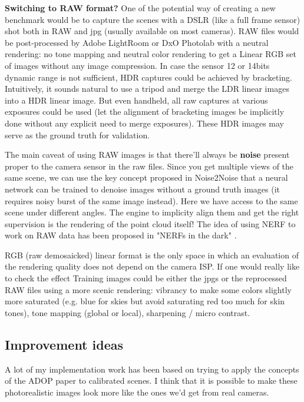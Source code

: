 \noindent \textbf{Switching to RAW format?} 
One of the potential way of creating a new benchmark would be to capture the scenes with a DSLR (like a full frame sensor) shot both in RAW and jpg (usually available on most cameras). RAW files would be post-processed by Adobe LightRoom or DxO Photolab with a neutral rendering: no tone mapping and neutral color rendering to get a Linear RGB set of images without any image compression. In case the sensor 12 or 14bits dynamic range is not sufficient, HDR captures could be achieved by bracketing. Intuitively, it sounds natural to use a tripod and merge the LDR linear images into a HDR linear image. But even handheld, all raw captures at various exposures could be used (let the alignment of bracketing images be implicitly done without any explicit need to merge exposures). These HDR images may serve as the ground truth for validation.

The main caveat of using RAW images is that there'll always be \textbf{noise} present proper to the camera sensor in the raw files. Since you get multiple views of the same scene, we can use the key concept proposed in Noise2Noise \cite{lehtinen2018noise2noise} that a neural network can be trained to denoise images without a ground truth images (it requires noisy burst of the same image instead). Here we have access to the same scene under different angles. The engine to implicity align them and get the right supervision is the rendering of the point cloud itself! The idea of using NERF to work on RAW data has been proposed in "NERFs in the dark" \cite{mildenhall2022rawnerf}.


RGB (raw demosaicked) linear format is the only space in which an evaluation of the rendering quality does not depend on the camera ISP.
If one would really like to check the effect Training images could be either the jpgs or the reprocessed RAW files using a more scenic rendering: vibrancy to make some colors slightly more saturated (e.g. blue for skies but avoid saturating red too much for skin tones), tone mapping (global or local), sharpening / micro contrast.



\subsection{Improvement ideas}
\label{subsec:improvement_ideas}
A lot of my implementation work has been based on trying to apply the concepts of the ADOP paper to calibrated scenes. I think that it is possible to make these photorealistic images look more like the ones we'd get from real cameras.


